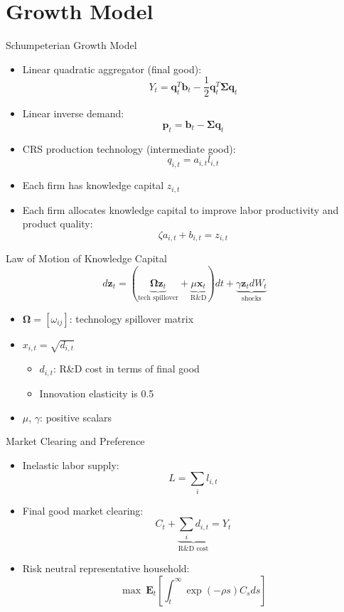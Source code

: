 \documentclass[
  aspectratio=169,  %
]{beamer}
\theoremstyle{plain}
\begin{document}
\section{Growth Model}
\begin{frame}{Schumpeterian Growth Model}

  \begin{itemize}
    \item Linear quadratic aggregator (final good):
          \[
            Y_{t}=\symbf{q}_{t}^{T}\symbf{b}_{t}-\frac{1}{2}\symbf{q}_{t}^{T}\symbf{\Sigma}\symbf{q}_{t}
          \]
    \item Linear inverse demand:
          \[
            \symbf{p}_{t}=\symbf{b}_{t}-\symbf{\Sigma}\symbf{q}_{t}
          \]
    \item CRS production technology (intermediate good): \[q_{i,t}=a_{i,t}l_{i,t}\]
    \item Each firm has knowledge capital $z_{i,t}$\medskip{}
    \item Each firm allocates knowledge capital to improve labor productivity
          and product quality:
          \[
            \zeta a_{i,t}+b_{i,t}=z_{i,t}
          \]
  \end{itemize}
\end{frame}
%
\begin{frame}{Law of Motion of Knowledge Capital}
  \[
    d\symbf{z}_{t}=\left(\underbrace{\symbf{\Omega}\symbf{z}_{t}}_{\text{tech spillover}}+\underbrace{\mu\symbf{x}_{t}}_{\text{R\&D}}\right)dt+\underbrace{\gamma\symbf{z}_{t}dW_{t}}_{\text{shocks}}
  \]
  \begin{itemize}
    \item $\symbf{\Omega}=\left[\omega_{ij}\right]$: technology spillover matrix\medskip{}
    \item $x_{i,t}=\sqrt{d_{i,t}}$
          \begin{itemize}
            \item $d_{i,t}$: R\&D cost in terms of final good
            \item Innovation elasticity is 0.5\medskip{}
          \end{itemize}
    \item $\mu$, $\gamma$: positive scalars
  \end{itemize}
\end{frame}
%
\begin{frame}{Market Clearing and Preference}
  \begin{itemize}
    \item Inelastic labor supply:
          \[
            L=\sum_{i}l_{i,t}
          \]
    \item Final good market clearing:
          \[
            C_{t}+\underbrace{\sum_{i}d_{i,t}}_{\text{R\&D cost}}=Y_{t}
          \]
    \item Risk neutral representative household:
          \[
            \max\ \symbf{E}_{t}\left[\int_{t}^{\infty}\exp\left(-\rho s\right)C_{s}ds\right]
          \]
  \end{itemize}
\end{frame}
%
\end{document}
